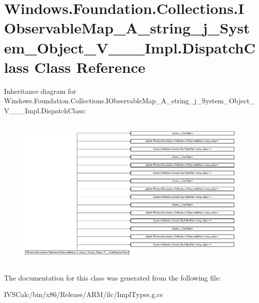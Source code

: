\hypertarget{class_windows_1_1_foundation_1_1_collections_1_1_i_observable_map___a__string__j___system___objeb535afeab02e986236f3f25afeb647de}{}\section{Windows.\+Foundation.\+Collections.\+I\+Observable\+Map\+\_\+\+A\+\_\+string\+\_\+j\+\_\+\+System\+\_\+\+Object\+\_\+\+V\+\_\+\+\_\+\+\_\+\+Impl.\+Dispatch\+Class Class Reference}
\label{class_windows_1_1_foundation_1_1_collections_1_1_i_observable_map___a__string__j___system___objeb535afeab02e986236f3f25afeb647de}
Inheritance diagram for Windows.\+Foundation.\+Collections.\+I\+Observable\+Map\+\_\+\+A\+\_\+string\+\_\+j\+\_\+\+System\+\_\+\+Object\+\_\+\+V\+\_\+\+\_\+\+\_\+\+Impl.\+Dispatch\+Class\+:\begin{figure}[H]
\begin{center}
\leavevmode
\includegraphics[height=7.479132cm]{class_windows_1_1_foundation_1_1_collections_1_1_i_observable_map___a__string__j___system___objeb535afeab02e986236f3f25afeb647de}
\end{center}
\end{figure}


The documentation for this class was generated from the following file\+:\begin{DoxyCompactItemize}
\item 
I\+V\+S\+Calc/bin/x86/\+Release/\+A\+R\+M/ilc/Impl\+Types.\+g.\+cs\end{DoxyCompactItemize}
